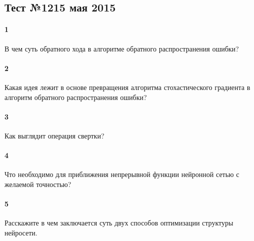 \documentclass[a4paper,12pt]{article}
\begin{document}
  \subsection*{Тест №12\hfill{15 мая 2015}}


  \paragraph{1} В чем суть обратного хода в алгоритме обратного распространения ошибки?

	\makebox[\linewidth]{\hrulefill}
	\makebox[\linewidth]{\hrulefill}
	\makebox[\linewidth]{\hrulefill}
	\makebox[\linewidth]{\hrulefill}
	
  \paragraph{2} Какая идея лежит в основе превращения алгоритма стохастического градиента в алгоритм обратного распространения ошибки?

	\makebox[\linewidth]{\hrulefill}
	\makebox[\linewidth]{\hrulefill}
	\makebox[\linewidth]{\hrulefill}
	\makebox[\linewidth]{\hrulefill}
	
  \paragraph{3} Как выглядит операция свертки?

  \makebox[\linewidth]{\hrulefill}
  \makebox[\linewidth]{\hrulefill}
  \makebox[\linewidth]{\hrulefill}
  \makebox[\linewidth]{\hrulefill}

  \paragraph{4} Что необходимо для приближения непрерывной функции нейронной сетью с желаемой точностью?
  
  \makebox[\linewidth]{\hrulefill}
  \makebox[\linewidth]{\hrulefill}
  \makebox[\linewidth]{\hrulefill}
  \makebox[\linewidth]{\hrulefill}  
  
  \paragraph{5} Расскажите в чем заключается суть двух способов оптимизации структуры нейросети.

  \makebox[\linewidth]{\hrulefill}
  \makebox[\linewidth]{\hrulefill}
  \makebox[\linewidth]{\hrulefill}
  \makebox[\linewidth]{\hrulefill}
\end{document}
